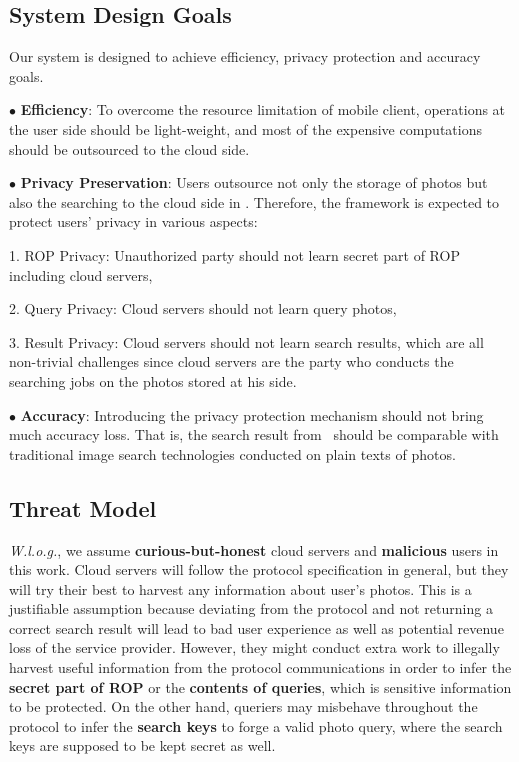 \subsection{System Design Goals}
\vspace{-0.05in}




Our system is designed to achieve efficiency, privacy protection and accuracy goals.

$\bullet$ \textbf{Efficiency}:
To overcome the resource limitation of mobile client,
 operations at the user side should be light-weight,
 and most of the expensive computations should be outsourced to the cloud side.

$\bullet$ \textbf{Privacy Preservation}:
Users outsource not only the storage of photos but also the searching to the cloud side in \ourprotocolNSP.
Therefore, the framework is expected to protect users' privacy in various aspects:


 1. ROP Privacy: Unauthorized party should not learn secret part of ROP including cloud servers,

 2. Query Privacy: Cloud servers should not learn query photos,

 3. Result Privacy: Cloud servers should not learn search results,
\noindent which are all non-trivial challenges since cloud servers are the party who conducts the searching jobs on the photos stored at his side.


$\bullet$ \textbf{Accuracy}:
Introducing the privacy protection mechanism should not bring much accuracy loss. That is, the search result from \ourprotocolNSP~should be comparable with traditional image search technologies conducted on plain texts of photos.


\vspace{-0.05in}
\subsection{Threat Model}
\vspace{-0.05in}




\textit{W.l.o.g.}, we assume \textbf{curious-but-honest} cloud servers and \textbf{malicious} users in this work. Cloud servers will follow the protocol specification in general, but they will try their best to harvest any information about user's photos. This is a justifiable assumption because deviating from the protocol and not returning a correct search result will lead to bad user experience as well as potential revenue loss of the service provider. However, they might conduct extra work to illegally harvest useful information from the protocol communications in order to infer the \textbf{secret part of ROP} or the \textbf{contents of queries}, which is sensitive information to be protected. On the other hand, queriers may misbehave throughout the protocol to infer the \textbf{search keys} to forge a valid photo query, where the search keys are supposed to be kept secret as well.



